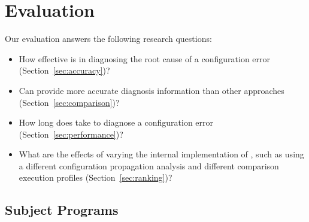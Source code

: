 \section{Evaluation}
\label{sec:evaluation}


Our evaluation answers the following research questions:



\begin{itemize}
\item How effective is \ourtool in diagnosing the root cause of
a configuration error (Section~\ref{sec:accuracy})?
\item Can \ourtool provide more accurate diagnosis information than
other approaches (Section~\ref{sec:comparison})? 
\item How long does \ourtool take to diagnose a configuration error (Section~\ref{sec:performance})?
\item What are the effects of varying the internal implementation of \ourtool,
such as using a different configuration propagation analysis and
different comparison execution profiles (Section~\ref{sec:ranking})?
\end{itemize}


\subsection{Subject Programs}

